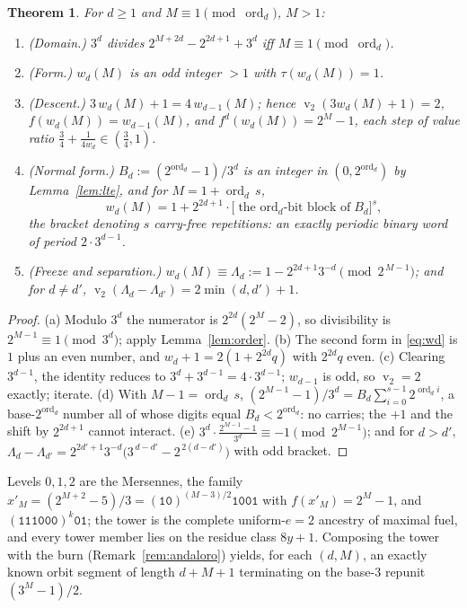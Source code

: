 \documentclass[11pt]{article}
\newtheorem{theorem}{Theorem}[section]
\theoremstyle{definition}
\theoremstyle{remark}
\newcommand{\ord}{\operatorname{ord}}
\DeclareMathOperator{\vv}{v}
\begin{document}
\begin{theorem}\label{thm:D}
For $d\ge1$ and $M\equiv1\pmod{\ord_d}$, $M>1$:
\begin{enumerate}
\item[(a)] \textup{(Domain.)} $3^{d}$ divides
$2^{M+2d}-2^{2d+1}+3^{d}$ iff $M\equiv1\pmod{\ord_d}$.
\item[(b)] \textup{(Form.)} $w_d(M)$ is an odd integer $>1$ with
$\tau(w_d(M))=1$.
\item[(c)] \textup{(Descent.)} $3\,w_d(M)+1=4\,w_{d-1}(M)$; hence
$\vv_2(3w_d(M)+1)=2$, $f(w_d(M))=w_{d-1}(M)$, and
$f^{d}(w_d(M))=2^{M}-1$, each step of value ratio
$\tfrac34+\tfrac1{4w_d}\in(\tfrac34,1)$.
\item[(d)] \textup{(Normal form.)} $B_d:=(2^{\ord_d}-1)/3^{d}$ is an
integer in $(0,2^{\ord_d})$ by Lemma~\ref{lem:lte}, and for
$M=1+\ord_d\,s$,
\[
w_d(M)=1+2^{2d+1}\cdot\bigl[\text{the $\ord_d$-bit block of
}B_d\bigr]^{s},
\]
the bracket denoting $s$ carry-free repetitions: an exactly periodic
binary word of period $2\cdot3^{d-1}$.
\item[(e)] \textup{(Freeze and separation.)}
$w_d(M)\equiv\Lambda_d:=1-2^{2d+1}3^{-d}\pmod{2^{\,M-1}}$; and for
$d\ne d'$, $\vv_2(\Lambda_d-\Lambda_{d'})=2\min(d,d')+1$.
\end{enumerate}
\end{theorem}

\begin{proof}
(a) Modulo $3^{d}$ the numerator is $2^{2d}(2^{M}-2)$, so divisibility
is $2^{M-1}\equiv1\pmod{3^d}$; apply Lemma~\ref{lem:order}.
(b) The second form in \eqref{eq:wd} is $1$ plus an even number, and
$w_d+1=2(1+2^{2d}q)$ with $2^{2d}q$ even.
(c) Clearing $3^{d-1}$, the identity reduces to
$3^{d}+3^{d-1}=4\cdot3^{d-1}$; $w_{d-1}$ is odd, so $\vv_2=2$ exactly;
iterate.
(d) With $M-1=\ord_d\,s$,
$(2^{M-1}-1)/3^{d}=B_d\sum_{i=0}^{s-1}2^{\ord_d i}$, a
base-$2^{\ord_d}$ number all of whose digits equal $B_d<2^{\ord_d}$: no
carries; the $+1$ and the shift by $2^{2d+1}$ cannot interact.
(e) $3^{d}\cdot\tfrac{2^{M-1}-1}{3^{d}}\equiv-1\pmod{2^{M-1}}$; and for
$d>d'$,
$\Lambda_d-\Lambda_{d'}=2^{2d'+1}3^{-d}\bigl(3^{\,d-d'}-2^{\,2(d-d')}\bigr)$
with odd bracket.
\end{proof}

Levels $0,1,2$ are the Mersennes, the family
$x'_M=(2^{M+2}-5)/3=(\texttt{10})^{(M-3)/2}\texttt{1001}$ with
$f(x'_M)=2^M-1$, and $(\texttt{111000})^{k}\texttt{01}$; the tower is
the complete uniform-$e{=}2$ ancestry of maximal fuel, and every tower
member lies on the residue class $8y+1$. Composing the tower with the
burn (Remark~\ref{rem:andaloro}) yields, for each $(d,M)$, an exactly
known orbit segment of length $d+M+1$ terminating on the base-$3$
repunit $(3^{M}-1)/2$.
\end{document}
